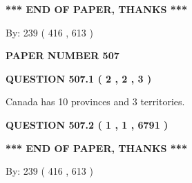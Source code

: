 \documentclass[12pt]{article}
\begin{document}
   
   
   
   
\vspace{1.0in} 
{\textbf{\large{ *** END OF PAPER, THANKS *** }}} 
   
   
\hspace{1.0in} By: 
 239 ( 416 ,  613 )
   
   
   
   
\newpage 
\setcounter{page}{ 
   507001 } 
   
   
   
   
 {\textbf{ \Large{ PAPER NUMBER  507  }}}
   
   
\vspace{0.2in}
   
   
   
   
   
   
 \vspace{0.2in}
 
 
 
 
   
   
  
\vspace{0.2in}
  
{\textbf{\Large{QUESTION
507.1 
 ( 2 , 2 , 3 )
}}}
  
  
 
 
\noindent{}
 
 
Canada has 10  provinces and 3 territories.
 
 
 
 
  
\vspace{0.2in}
  
{\textbf{\Large{QUESTION
507.2 
 ( 1 , 1 , 6791 )
}}}
  
  
   
   
 \vspace{0.2in}
 
   
   
   
   
\vspace{1.0in} 
{\textbf{\large{ *** END OF PAPER, THANKS *** }}} 
   
   
\hspace{1.0in} By: 
 239 ( 416 ,  613 )
   
   
   
   
\newpage 
\setcounter{page}{ 
   508001 } 
   
\end{document}
